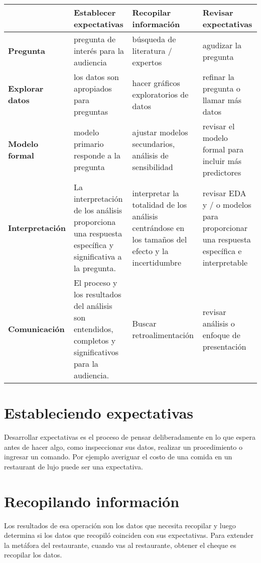 \documentclass[10pt]{book}
\begin{document}
\begin{center}
\begin{tabular}{|m{2.6cm}| m{3cm} | m{3cm}| m{3cm} | }
\hline
&\textbf{Establecer expectativas}&\textbf{Recopilar información}&\textbf{Revisar expectativas}\\
\hline
\textbf{Pregunta}&pregunta de interés para la audiencia&búsqueda de literatura / expertos&agudizar la pregunta\\
\hline
\textbf{Explorar datos}&los datos son apropiados para preguntas&hacer gráficos exploratorios de datos&refinar la pregunta o llamar más datos\\
\hline
\textbf{Modelo formal}&modelo primario responde a la pregunta&ajustar modelos secundarios, análisis de sensibilidad&revisar el modelo formal para incluir más predictores\\
\hline
\textbf{Interpretación}&La interpretación de los análisis proporciona una respuesta específica y significativa a la pregunta.&interpretar la totalidad de los análisis centrándose en los tamaños del efecto y la incertidumbre&revisar EDA y / o modelos para proporcionar una respuesta específica e interpretable\\
\hline
\textbf{Comunicación}&El proceso y los resultados del análisis son entendidos, completos y significativos para la audiencia.&Buscar retroalimentación&revisar análisis o enfoque de presentación\\
\hline
\end{tabular}
\end{center}

\section{Estableciendo expectativas}
Desarrollar expectativas es el proceso de pensar deliberadamente en lo que espera antes de hacer algo, como inspeccionar sus datos, realizar un procedimiento o ingresar un comando. Por ejemplo averiguar el costo de una comida en un restaurant de lujo puede ser una expectativa.

\section{Recopilando información}
Los resultados de esa operación son los datos que necesita recopilar y luego determina si los datos que recopiló coinciden con sus expectativas. Para extender la metáfora del restaurante, cuando vas al restaurante, obtener el cheque es recopilar los datos.
\end{document}
